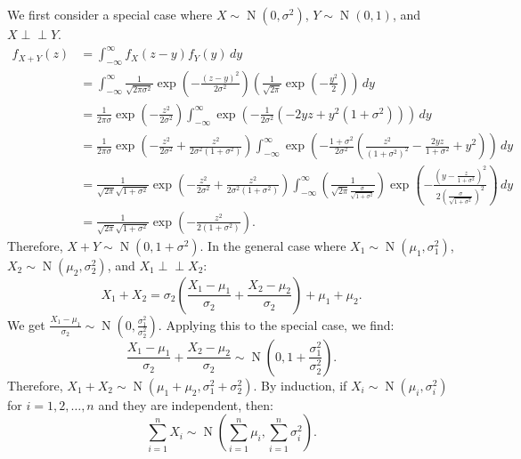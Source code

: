 \documentclass{huhtakm-template-book-v2}
\newcommand{\independent}{\perp\!\!\!\perp}
\DeclareMathOperator{\N}{N}
\begin{document}
    \begin{proofing}
        We first consider a special case where $X \sim \N(0,\sigma^{2})$, $Y \sim \N(0,1)$, and $X \independent Y$.
        \begin{align*}
            f_{X+Y}(z) &= \int_{-\infty}^{\infty} f_{X}(z-y)f_{Y}(y)\,dy\\
            &= \int_{-\infty}^{\infty}\frac{1}{\sqrt{2\pi\sigma^{2}}}\exp\left(-\frac{(z-y)^{2}}{2\sigma^{2}}\right)\left(\frac{1}{\sqrt{2\pi}}\exp\left(-\frac{y^{2}}{2}\right)\right)\,dy\\
            &= \frac{1}{2\pi\sigma}\exp\left(-\frac{z^{2}}{2\sigma^{2}}\right)\int_{-\infty}^{\infty}\exp\left(-\frac{1}{2\sigma^{2}}(-2yz+y^{2}(1+\sigma^{2}))\right)\,dy\\
            &= \frac{1}{2\pi\sigma}\exp\left(-\frac{z^{2}}{2\sigma^{2}}+\frac{z^{2}}{2\sigma^{2}(1+\sigma^{2})}\right)\int_{-\infty}^{\infty}\exp\left(-\frac{1+\sigma^{2}}{2\sigma^{2}}\left(\frac{z^{2}}{(1+\sigma^{2})^{2}}-\frac{2yz}{1+\sigma^{2}}+y^{2}\right)\right)\,dy\\
            &= \frac{1}{\sqrt{2\pi}\sqrt{1+\sigma^{2}}}\exp\left(-\frac{z^{2}}{2\sigma^{2}}+\frac{z^{2}}{2\sigma^{2}(1+\sigma^{2})}\right)\int_{-\infty}^{\infty}\left(\frac{1}{\sqrt{2\pi}\frac{\sigma}{\sqrt{1+\sigma^{2}}}}\right)\exp\left(-\frac{\left(y-\frac{z}{1+\sigma^{2}}\right)^{2}}{2\left(\frac{\sigma}{\sqrt{1+\sigma^{2}}}\right)^{2}}\right)\,dy\\
            &= \frac{1}{\sqrt{2\pi}\sqrt{1+\sigma^{2}}}\exp\left(-\frac{z^{2}}{2(1+\sigma^{2})}\right).
        \end{align*}
        Therefore, $X+Y \sim \N(0,1+\sigma^{2})$. In the general case where $X_{1} \sim \N(\mu_{1},\sigma_{1}^{2})$, $X_{2} \sim \N(\mu_{2},\sigma_{2}^{2})$, and $X_{1} \independent X_{2}$:
        \begin{equation*}
            X_{1}+X_{2} = \sigma_{2}\left(\frac{X_{1}-\mu_{1}}{\sigma_{2}}+\frac{X_{2}-\mu_{2}}{\sigma_{2}}\right)+\mu_{1}+\mu_{2}.
        \end{equation*}
        We get $\frac{X_{1}-\mu_{1}}{\sigma_{2}} \sim \N\left(0,\frac{\sigma_{1}^{2}}{\sigma_{2}^{2}}\right)$. Applying this to the special case, we find:
        \begin{equation*}
            \frac{X_{1}-\mu_{1}}{\sigma_{2}}+\frac{X_{2}-\mu_{2}}{\sigma_{2}} \sim \N\left(0,1+\frac{\sigma_{1}^{2}}{\sigma_{2}^{2}}\right).
        \end{equation*}
        Therefore, $X_{1}+X_{2} \sim \N(\mu_{1}+\mu_{2},\sigma_{1}^{2}+\sigma_{2}^{2})$. By induction, if $X_{i} \sim \N(\mu_{i},\sigma_{i}^{2})$ for $i = 1,2,\dots,n$ and they are independent, then:
        \begin{equation*}
            \sum_{i = 1}^{n}X_{i} \sim \N\left(\sum_{i = 1}^{n}\mu_{i},\sum_{i = 1}^{n}\sigma_{i}^{2}\right).
        \end{equation*}
    \end{proofing}
    \newpage
\end{document}
